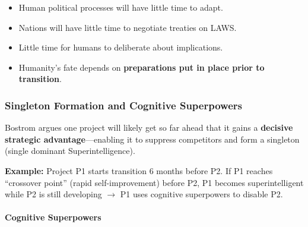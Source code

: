 \begin{tipbox}
\begin{itemize}
  \item Human political processes will have little time to adapt.
  \item Nations will have little time to negotiate treaties on LAWS.
  \item Little time for humans to deliberate about implications.
  \item Humanity's fate depends on \textbf{preparations put in place prior to transition}.
\end{itemize}
\end{tipbox}

\separator

\subsubsection{Singleton Formation and Cognitive Superpowers}

\begin{defbox}[Singleton]
Bostrom argues one project will likely get so far ahead that it gains a \textbf{decisive strategic advantage}---enabling it to suppress competitors and form a singleton (single dominant Superintelligence).

\textbf{Example:} Project P1 starts transition 6 months before P2. If P1 reaches ``crossover point'' (rapid self-improvement) before P2, P1 becomes superintelligent while P2 is still developing $\to$ P1 uses cognitive superpowers to disable P2.
\end{defbox}

\paragraph*{Cognitive Superpowers}


